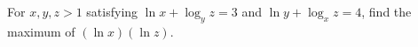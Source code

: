 For $x,y,z>1$ satisfying $\ln x+\log_yz=3$ and $\ln y+\log_xz=4$, find the maximum of $(\ln x)(\ln z)$.
